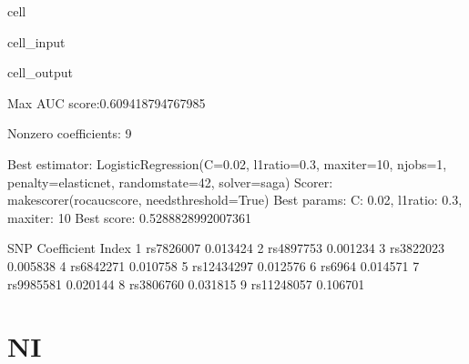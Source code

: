 \documentclass[letterpaper,10pt,english]{jupyterBook}
\begin{document}
\begin{sphinxuseclass}{cell}
\begin{sphinxVerbatimInput}
\begin{sphinxuseclass}{cell_input}
\end{sphinxuseclass}\end{sphinxVerbatimInput}
\begin{sphinxVerbatimOutput}

\begin{sphinxuseclass}{cell_output}
\begin{sphinxVerbatim}[commandchars=\\\{\}]
Max AUC score:0.609418794767985

Non\PYGZhy{}zero coefficients: 9

Best estimator: LogisticRegression(C=0.02, l1\PYGZus{}ratio=0.3, max\PYGZus{}iter=10, n\PYGZus{}jobs=\PYGZhy{}1,
                   penalty=\PYGZsq{}elasticnet\PYGZsq{}, random\PYGZus{}state=42, solver=\PYGZsq{}saga\PYGZsq{})
Scorer: make\PYGZus{}scorer(roc\PYGZus{}auc\PYGZus{}score, needs\PYGZus{}threshold=True)
Best params: \PYGZob{}\PYGZsq{}C\PYGZsq{}: 0.02, \PYGZsq{}l1\PYGZus{}ratio\PYGZsq{}: 0.3, \PYGZsq{}max\PYGZus{}iter\PYGZsq{}: 10\PYGZcb{}
Best score: 0.5288828992007361
\end{sphinxVerbatim}

\begin{sphinxVerbatim}[commandchars=\\\{\}]
              SNP Coefficient
Index                        
1       rs7826007   \PYGZhy{}0.013424
2       rs4897753    0.001234
3       rs3822023    0.005838
4       rs6842271    0.010758
5      rs12434297    0.012576
6          rs6964    0.014571
7       rs9985581    0.020144
8       rs3806760    0.031815
9      rs11248057    0.106701
\end{sphinxVerbatim}

\end{sphinxuseclass}\end{sphinxVerbatimOutput}

\end{sphinxuseclass}

\section{NI}
\label{\detokenize{Cooper:ni}}
\end{document}
